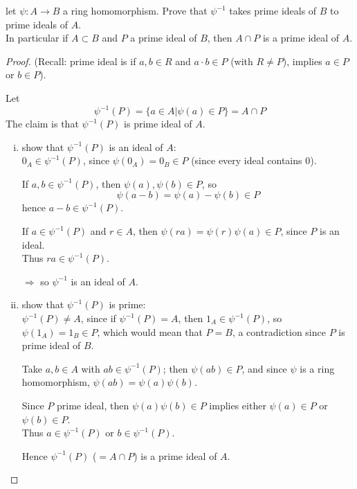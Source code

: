 \documentclass{article}
\theoremstyle{definition}
\newenvironment{ex}[1]
{\renewcommand\theinnerex{#1}\innerex}
{\endinnerex}
\begin{document}
\begin{ex}{R.1.5}
  let $\psi: A \longrightarrow B$ a ring homomorphism. Prove that $\psi^{-1}$ takes prime ideals of $B$ to prime ideals of $A$.\\
  In particular if $A \subset B$ and $P$ a prime ideal of $B$, then $A \cap P$ is a prime ideal of $A$.
\end{ex}
\begin{proof}
  (Recall: prime ideal is if $a,b \in R$ and $a \cdot b \in P$ (with $R \neq P$), implies $a \in P$ or $b \in P$).

  Let
  $$\psi^{-1}(P) = \{ a \in A | \psi(a) \in P \} = A \cap P$$
  The claim is that $\psi^{-1}(P)$ is prime ideal of $A$.

  \begin{enumerate}[i.]
    \item show that $\psi^{-1}(P)$ is an ideal of $A$:\\
      $0_A \in \psi^{-1}(P)$, since $\psi(0_A)=0_B \in P$ (since every ideal contains $0$).

      If $a,b \in \psi^{-1}(P)$, then $\psi(a), \psi(b) \in P$, so
      $$\psi(a-b)= \psi(a) - \psi(b) \in P$$
      hence $a-b \in \psi^{-1}(P)$.

      If $a \in \psi^{-1}(P)$ and $r \in A$, then $\psi(ra) = \psi(r) \psi(a) \in P$, since $P$ is an ideal.\\
      Thus $ra \in \psi^{-1}(P)$.

      $\Longrightarrow$ so $\psi^{-1}$ is an ideal of $A$.

    \item show that $\psi^{-1}(P)$ is prime:\\
      $\psi^{-1}(P) \neq A$, since if $\psi^{-1}(P)=A$, then $1_A \in \psi^{-1}(P)$, so $\psi(1_A)=1_B \in P$, which would mean that $P=B$, a contradiction since $P$ is prime ideal of $B$.

      Take $a,b \in A$ with $ab \in \psi^{-1}(P)$; then $\psi(ab) \in P$, and since $\psi$ is a ring homomorphism, $\psi(ab) = \psi(a)\psi(b)$.

      Since $P$ prime ideal, then $\psi(a)\psi(b) \in P$ implies either $\psi(a) \in P$ or $\psi(b) \in P$.\\
      Thus $a \in \psi^{-1}(P)$ or $b \in \psi^{-1}(P)$.

      Hence $\psi^{-1}(P)$ ($=A \cap P$) is a prime ideal of $A$.
  \end{enumerate}
\end{proof}
\end{document}
